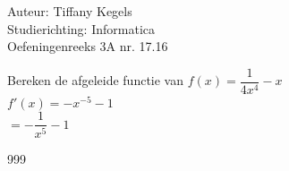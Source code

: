 \documentclass[a4paper]{article}
\begin{document}
  
\noindent \large Auteur: Tiffany Kegels \\
\noindent \large Studierichting: Informatica\\
\noindent \large Oefeningenreeks 3A nr. 17.16\\

\medskip

\normalsize

Bereken de afgeleide functie van $f(x) = \dfrac{1}{4x^4} - x$\\

$f'(x) = -x^{-5} -1$\\

$= -\dfrac{1}{x^5} - 1$



\begin{thebibliography}{999}

\end{thebibliography}
\end{document}
